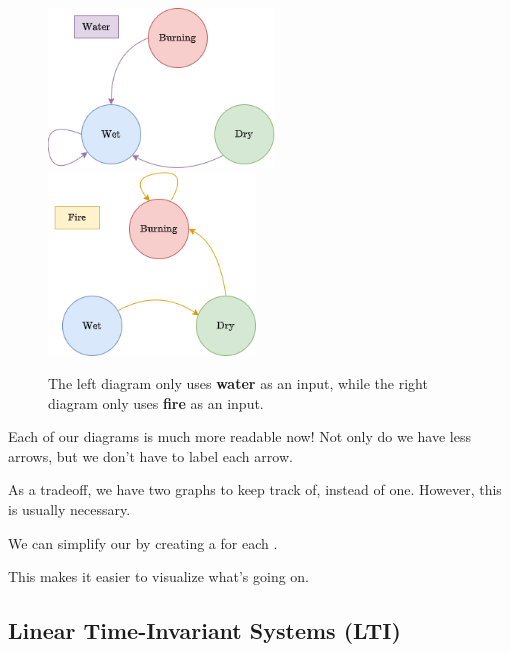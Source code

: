         \begin{figure}[H]
            \centering
            \includegraphics[width=60mm,scale=0.4]{images/rnn_images/std_water_no_label.png}
            \qquad
            \includegraphics[width=55mm,scale=0.4]{images/rnn_images/std_fire.png}
            
            \caption*{The left diagram only uses \textbf{water} as an input, while the right diagram only uses \textbf{fire} as an input.}
        \end{figure}
        
        Each of our diagrams is much more readable now! Not only do we have less arrows, but we don't have to label each arrow.
        
        As a tradeoff, we have two graphs to keep track of, instead of one. However, this is usually necessary.
            \\
            
        \begin{concept}
            We can simplify our  by creating a  for each .
            
            This makes it easier to visualize what's going on.
        \end{concept}

    \pagebreak

    \subsection{Linear Time-Invariant Systems (LTI)}

